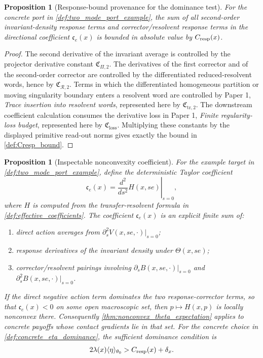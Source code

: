 \documentclass[11pt]{amsart}
\newtheorem{proposition}[theorem]{Proposition}
\theoremstyle{definition}
\theoremstyle{remark}
\newcommand{\PaperOne}[2]{Paper 1, \emph{#1}}
\begin{document}
\begin{proposition}[Response-bound provenance for the dominance test]
\label{prop:Cresp_controls_response_terms}
For the concrete port in \cref{def:two_mode_port_example}, the sum of all
second-order invariant-density response terms and corrector/resolvent response
terms in the directional coefficient $\mathfrak c_e(x)$ is bounded in absolute
value by $C_{\rm resp}(x)$.
\end{proposition}

\begin{proof}
The second derivative of the invariant average is controlled by the projector
derivative constant $\mathfrak C_{\Pi,2}$.  The derivatives of the first
corrector and of the second-order corrector are controlled by the differentiated
reduced-resolvent words, hence by $\mathfrak C_{\mathcal R,2}$.  Terms in which
the differentiated homogeneous partition or moving singularity boundary enters
a resolvent word are controlled by
\PaperOne{Trace insertion into resolvent words}{lem:trace_resolvent_insertion},
represented here by $\mathfrak C_{\mathrm{tr},2}$.  The downstream coefficient
calculation consumes the derivative loss in
\PaperOne{Finite regularity-loss budget}{thm:regularity_loss_budget},
represented here by $\mathfrak C_{\mathrm{loss}}$.  Multiplying these constants
by the displayed primitive read-out norms gives exactly the bound in
\cref{def:Cresp_bound}.
\end{proof}

\begin{proposition}[Inspectable nonconvexity coefficient]
\label{prop:inspectable_nonconvexity_coefficient}
For the example target in \cref{def:two_mode_port_example}, define the
deterministic Taylor coefficient
\begin{equation}
  \mathfrak c_e(x)=
  \left.\frac{d^2}{ds^2}H(x,se)\right|_{s=0},
\end{equation}
where $H$ is computed from the transfer-resolvent formula in
\cref{def:effective_coefficients}.  The coefficient $\mathfrak c_e(x)$ is an
explicit finite sum of:
\begin{enumerate}[label=\textup{(\roman*)},wide,labelindent=0pt]
  \item direct action averages from $\partial_s^2V(x,se,\cdot)|_{s=0}$;
  \item response derivatives of the invariant density under
  $\Theta(x,se)$;
  \item corrector/resolvent pairings involving
  $\partial_sB(x,se,\cdot)|_{s=0}$ and
  $\partial_s^2B(x,se,\cdot)|_{s=0}$.
\end{enumerate}
If the direct negative action term dominates the two response-corrector terms,
so that $\mathfrak c_e(x)<0$ on some open macroscopic set, then
$p\mapsto H(x,p)$ is locally nonconvex there.  Consequently
\cref{thm:nonconvex_theta_expectation} applies to concrete payoffs whose
contact gradients lie in that set.  For the concrete choice in
\cref{def:concrete_eta_dominance}, the sufficient dominance condition is
\[
  2\lambda(x)\langle\eta\rangle_{\theta_0}
  >C_{\rm resp}(x)+\delta_x .
\]
\end{proposition}
\end{document}
